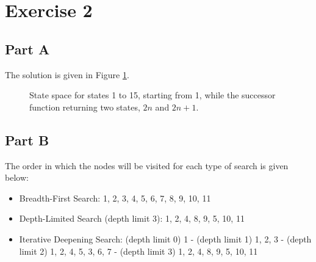 \section*{Exercise 2}

\subsection*{Part A}

The solution is given in Figure \ref{fig:exercise2}.

\begin{figure}[htpb]
\centering
{}
\caption{State space for states 1 to 15, starting from 1, while the successor function returning two states, $2n$ and $2n+1$.}
\label{fig:exercise2}
\end{figure} %

\subsection*{Part B}

The order in which the nodes will be visited for each type of search is given below:

\begin{itemize}

\item Breadth-First Search: 1, 2, 3, 4, 5, 6, 7, 8, 9, 10, 11

\item Depth-Limited Search (depth limit 3): 1, 2, 4, 8, 9, 5, 10, 11

\item Iterative Deepening Search: (depth limit 0) 1 - (depth limit 1) 1, 2, 3 - (depth limit 2) 1, 2, 4, 5, 3, 6, 7 - (depth limit 3) 1, 2, 4, 8, 9, 5, 10, 11

\end{itemize}

